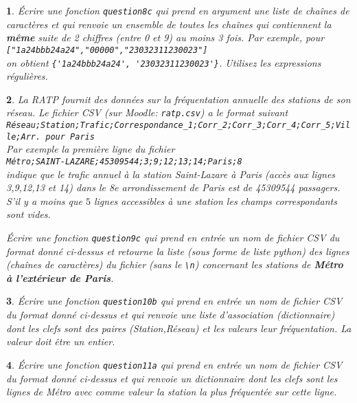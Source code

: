 \documentclass[10pt]{article}
\newtheorem{exi}{}
\newenvironment{exo}{\begin{exi}\em}{\end{exi}}
\begin{document}
\begin{exo}
    Écrire une fonction {\tt question8c} qui prend en argument une liste
de chaînes de caractères et qui renvoie un ensemble de toutes les chaînes
qui contiennent la {\bf même} suite de 2
chiffres (entre 0 et 9) au moins 3 fois.
Par exemple, pour \verb+["1a24bbb24a24","00000","23032311230023"]+\\
on obtient \verb+{'1a24bbb24a24', '23032311230023'}+.
Utilisez les expressions régulières.
\end{exo}
\begin{exo}
    La RATP fournit des données sur la fréquentation annuelle des stations de son réseau. Le fichier CSV (sur Moodle: \verb+ratp.csv+) a le format suivant\\
\verb+Réseau;Station;Trafic;Correspondance_1;Corr_2;Corr_3;Corr_4;Corr_5;Ville;Arr. pour Paris+\\
Par exemple la première ligne du fichier\\
\verb+Métro;SAINT-LAZARE;45309544;3;9;12;13;14;Paris;8+\\
indique que le trafic annuel à la station Saint-Lazare à Paris (accès aux lignes 3,9,12,13 et 14) dans le 8e arrondissement de Paris est de 45309544 passagers. S'il y a moins que $5$ lignes accessibles à une station les champs correspondants sont vides. 

Écrire une fonction {\tt question9c} qui prend en entrée un nom de fichier CSV
du format donné ci-dessus
et retourne la liste (sous forme de liste python) des lignes (chaînes
de caractères) du fichier (sans le \verb+\n+)
concernant les stations de {\bf Métro à l'extérieur de Paris}.
\end{exo}
\begin{exo}
    Écrire une fonction {\tt question10b} qui prend en entrée un nom de fichier CSV
du format donné ci-dessus
et qui renvoie une liste d'association (dictionnaire) dont les clefs sont
des paires (Station,Réseau) et les valeurs leur fréquentation.
La valeur doit être un entier.
\end{exo}
\begin{exo}
    Écrire une fonction {\tt question11a} qui prend en entrée un nom de fichier CSV
du format donné ci-dessus et qui renvoie un dictionnaire dont les clefs sont
les lignes de Métro
avec comme valeur la station la plus fréquentée sur cette ligne.
\end{exo}
\vspace*{-2ex}
\vspace*{-2ex}
\vspace*{-2ex}
\end{document}
